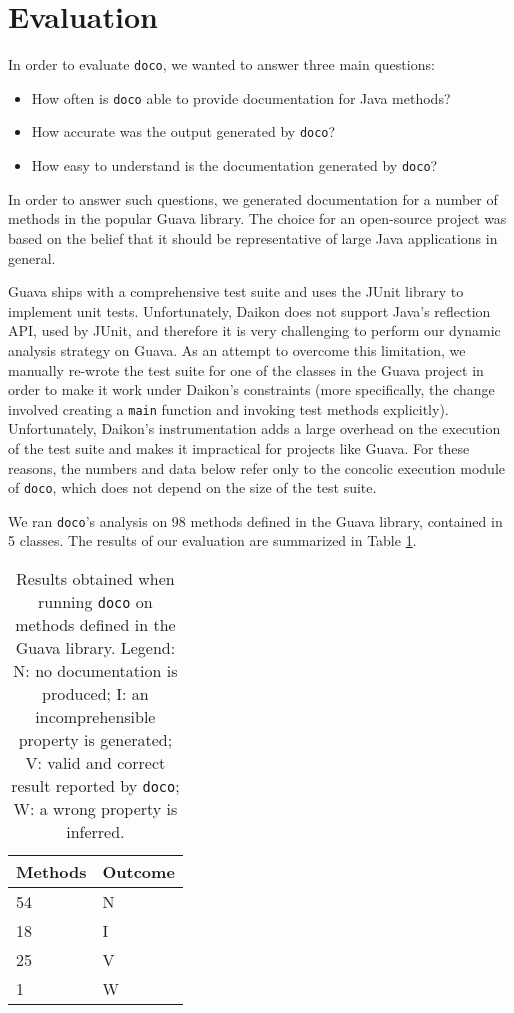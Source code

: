 \section{Evaluation}

In order to evaluate \texttt{doco}, we wanted to answer three main questions:

\begin{itemize}
    \item How often is \texttt{doco} able to provide documentation for Java methods?
    
    \item How accurate was the output generated by \texttt{doco}?
    
    \item How easy to understand is the documentation generated by \texttt{doco}?
\end{itemize}

In order to answer such questions, we generated documentation for a number of methods in the popular Guava \cite{guava:2018} library. The choice for an open-source project was based on the belief that it should be representative of large Java applications in general.

Guava ships with a comprehensive test suite and uses the JUnit library to implement unit tests. Unfortunately, Daikon does not support Java's reflection API, used by JUnit, and therefore it is very challenging to perform our dynamic analysis strategy on Guava. As an attempt to overcome this limitation, we manually re-wrote the test suite for one of the classes in the Guava project in order to make it work under Daikon's constraints (more specifically, the change involved creating a \texttt{main} function and invoking test methods explicitly). Unfortunately, Daikon's instrumentation adds a large overhead on the execution of the test suite and makes it impractical for projects like Guava. For these reasons, the numbers and data below refer only to the concolic execution module of \texttt{doco}, which does not depend on the size of the test suite.

We ran \texttt{doco}'s analysis on 98 methods defined in the Guava library, contained in 5 classes. The results of our evaluation are summarized in Table \ref{table:results}.

\begin{center}
\begin{table}[h]
    \begin{tabular}{ | l | l |}
    \hline
    Methods & Outcome \\ \hline
    54 & N \\ \hline  
    18 & I \\ \hline
    25 & V \\ \hline
    1 & W \\
    \hline
    \end{tabular}
    \caption{Results obtained when running \texttt{doco} on methods defined in the Guava library. Legend: N: no documentation is produced; I: an incomprehensible property is generated; V: valid and correct result reported by \texttt{doco}; W: a wrong property is inferred.}
    \label{table:results}
\end{table}
\end{center}


